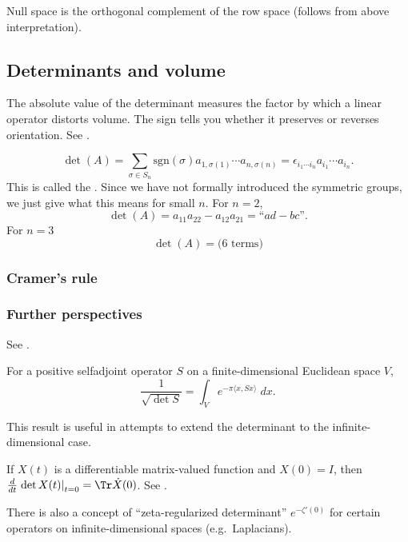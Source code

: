 Null space is the orthogonal complement of the row space (follows from above interpretation).

\subsection{Determinants and volume}

The absolute value of the determinant measures the factor by which a linear operator distorts volume. The sign tells you whether it preserves or reverses orientation. See \cite{Gari}.

\[ \det(A) = \sum_{\sigma \in S_n} \mathrm{sgn}(\sigma) a_{1,\sigma(1)} \cdots a_{n,\sigma(n)} = \epsilon_{i_1 \cdots i_n} a_{i_1} \cdots a_{i_n}. \]
This is called the . Since we have not formally introduced the symmetric groups, we just give what this means for small $n$. For $n=2$,
\[ \det(A) = a_{11} a_{22} - a_{12} a_{21} = \text{``$ad - bc$''}. \]
For $n=3$
\[ \det(A) = \text{(6 terms)} \]

\subsubsection{Cramer's rule}


\subsubsection{Further perspectives}

See \cite[Ch.\ 10]{Lax}.

\begin{theorem}
For a positive selfadjoint operator $S$ on a finite-dimensional Euclidean space $V$,
\[ \frac{1}{\sqrt{\det S}} = \int_V e^{-\pi \langle x, Sx \rangle} \; dx. \]
\end{theorem}

This result is useful in attempts to extend the determinant to the infinite-dimensional case.

\begin{remark}
If $X(t)$ is a differentiable matrix-valued function and $X(0) = I$, then $\frac{d}{dt} \left. \det X(t) \right|_{t=0} = \Tr \dot{X}(0)$. See \cite[p.\ 126]{Lax}.
\end{remark}

\begin{remark}
There is also a concept of ``zeta-regularized determinant'' $e^{-\zeta'(0)}$ for certain operators on infinite-dimensional spaces (e.g.\ Laplacians).
\end{remark}

